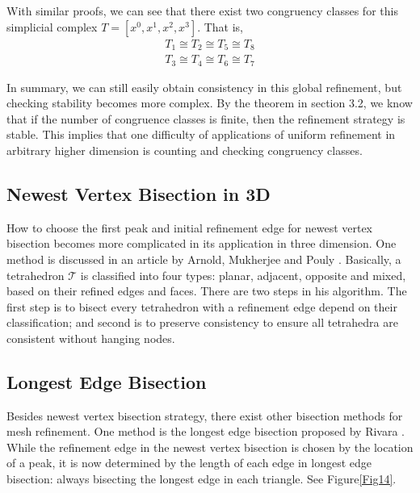 With similar proofs, we can see that there exist two congruency classes for this simplicial complex $T = [x^0, x^1, x^2, x^3]$. That is,
\begin{align*}
T_1 \cong T_2 \cong T_5 \cong T_8 \\
T_3 \cong T_4 \cong T_6 \cong T_7
\end{align*}

In summary, we can still easily obtain consistency in this global refinement, but checking stability becomes more complex. By the theorem in section 3.2, we know that if the number of congruence classes is finite, then the refinement strategy is stable. This implies that one difficulty of applications of uniform refinement in arbitrary higher dimension is counting and checking congruency classes.

\subsection{Newest Vertex Bisection in 3D}
How to choose the first peak and initial refinement edge for newest vertex bisection becomes more complicated in its application in three dimension. One method is discussed in an article by Arnold, Mukherjee and Pouly \cite{arnold2000locally}. 
Basically, a tetrahedron $\mathcal T$ is classified into four types: planar, adjacent, opposite and mixed, based on their refined edges and faces. There are two steps in his algorithm. The first step is to bisect every tetrahedron with a refinement edge depend on their classification; and second is to preserve consistency to ensure all tetrahedra are consistent without hanging nodes.

\subsection{Longest Edge Bisection}
Besides newest vertex bisection strategy, there exist other bisection methods for mesh refinement. One method is the longest edge bisection proposed by Rivara \cite{rivara1984mesh}. While the refinement edge in the newest vertex bisection is chosen by the location of a peak, it is now determined by the length of each edge in longest edge bisection: always bisecting the longest edge in each triangle. See Figure\ref{Fig14}.

